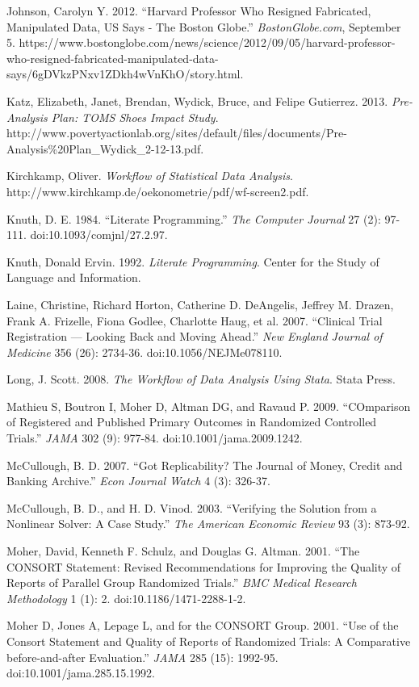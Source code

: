 \documentclass[12pt] {article}
\begin{document}
Johnson, Carolyn Y. 2012. ``Harvard Professor Who Resigned Fabricated,
Manipulated Data, US Says - The Boston Globe.'' \emph{BostonGlobe.com},
September 5.
https://www.bostonglobe.com/news/science/2012/09/05/harvard-professor-who-resigned-fabricated-manipulated-data-says/6gDVkzPNxv1ZDkh4wVnKhO/story.html.

Katz, Elizabeth, Janet, Brendan, Wydick, Bruce, and Felipe Gutierrez.
2013. \emph{Pre-Analysis Plan: TOMS Shoes Impact Study}.
http://www.povertyactionlab.org/sites/default/files/documents/Pre-Analysis\%20Plan\_Wydick\_2-12-13.pdf.

Kirchkamp, Oliver. \emph{Workflow of Statistical Data Analysis}.
http://www.kirchkamp.de/oekonometrie/pdf/wf-screen2.pdf.

Knuth, D. E. 1984. ``Literate Programming.'' \emph{The Computer Journal}
27 (2): 97-111. doi:10.1093/comjnl/27.2.97.

Knuth, Donald Ervin. 1992. \emph{Literate Programming}. Center for the
Study of Language and Information.

Laine, Christine, Richard Horton, Catherine D. DeAngelis, Jeffrey M.
Drazen, Frank A. Frizelle, Fiona Godlee, Charlotte Haug, et al. 2007.
``Clinical Trial Registration --- Looking Back and Moving Ahead.''
\emph{New England Journal of Medicine} 356 (26): 2734-36.
doi:10.1056/NEJMe078110.

Long, J. Scott. 2008. \emph{The Workflow of Data Analysis Using Stata}.
Stata Press.

Mathieu S, Boutron I, Moher D, Altman DG, and Ravaud P. 2009.
``COmparison of Registered and Published Primary Outcomes in Randomized
Controlled Trials.'' \emph{JAMA} 302 (9): 977-84.
doi:10.1001/jama.2009.1242.

McCullough, B. D. 2007. ``Got Replicability? The Journal of Money,
Credit and Banking Archive.'' \emph{Econ Journal Watch} 4 (3): 326-37.

McCullough, B. D., and H. D. Vinod. 2003. ``Verifying the Solution from
a Nonlinear Solver: A Case Study.'' \emph{The American Economic Review}
93 (3): 873-92.

Moher, David, Kenneth F. Schulz, and Douglas G. Altman. 2001. ``The
CONSORT Statement: Revised Recommendations for Improving the Quality of
Reports of Parallel Group Randomized Trials.'' \emph{BMC Medical
Research Methodology} 1 (1): 2. doi:10.1186/1471-2288-1-2.

Moher D, Jones A, Lepage L, and for the CONSORT Group. 2001. ``Use of
the Consort Statement and Quality of Reports of Randomized Trials: A
Comparative before-and-after Evaluation.'' \emph{JAMA} 285 (15):
1992-95. doi:10.1001/jama.285.15.1992.
\end{document}
